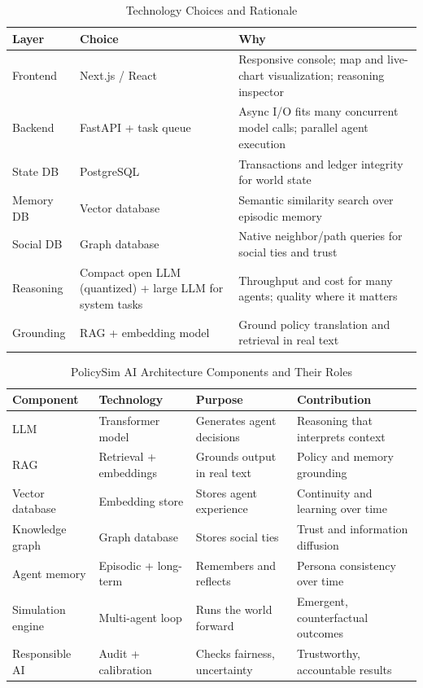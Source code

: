 \documentclass[conference]{IEEEtran}
\begin{document}
\begin{table}[!t]
\caption{Technology Choices and Rationale}
\label{tab:stack}
\centering
\renewcommand{\arraystretch}{1.2}
\footnotesize
\begin{tabular}{@{}p{1.5cm}p{2.0cm}p{3.1cm}@{}}
\toprule
\textbf{Layer} & \textbf{Choice} & \textbf{Why} \\
\midrule
Frontend & Next.js / React & Responsive console; map and live-chart visualization; reasoning inspector \\
Backend & FastAPI + task queue & Async I/O fits many concurrent model calls; parallel agent execution \\
State DB & PostgreSQL & Transactions and ledger integrity for world state \\
Memory DB & Vector database & Semantic similarity search over episodic memory \\
Social DB & Graph database & Native neighbor/path queries for social ties and trust \\
Reasoning & Compact open LLM (quantized) + large LLM for system tasks & Throughput and cost for many agents; quality where it matters \\
Grounding & RAG + embedding model & Ground policy translation and retrieval in real text \\
\bottomrule
\end{tabular}
\end{table}

\begin{table}[!t]
\caption{PolicySim AI Architecture Components and Their Roles}
\label{tab:pipeline}
\centering
\renewcommand{\arraystretch}{1.25}
\footnotesize
\begin{tabular}{@{}p{1.45cm}p{1.4cm}p{1.55cm}p{1.7cm}@{}}
\toprule
\textbf{Component} & \textbf{Technology} & \textbf{Purpose} & \textbf{Contribution} \\
\midrule
LLM & Transformer model & Generates agent decisions & Reasoning that interprets context \\
RAG & Retrieval + embeddings & Grounds output in real text & Policy and memory grounding \\
Vector database & Embedding store & Stores agent experience & Continuity and learning over time \\
Knowledge graph & Graph database & Stores social ties & Trust and information diffusion \\
Agent memory & Episodic + long-term & Remembers and reflects & Persona consistency over time \\
Simulation engine & Multi-agent loop & Runs the world forward & Emergent, counterfactual outcomes \\
Responsible AI & Audit + calibration & Checks fairness, uncertainty & Trustworthy, accountable results \\
\bottomrule
\end{tabular}
\end{table}
\end{document}
